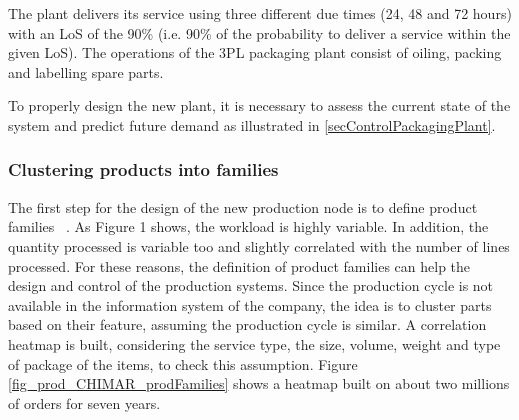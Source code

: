The plant delivers its service using three different due times (24, 48 and 72 hours) with an LoS of the 90\% (i.e. 90\% of the probability to deliver a service within the given LoS). The operations of the 3PL packaging plant consist of oiling, packing and labelling spare parts. \par

To properly design the new plant, it is necessary to assess the current state of the system and predict future demand as illustrated in \ref{secControlPackagingPlant}.

\subsubsection{Clustering products into families}

The first step for the design of the new production node is to define product families ~\cite{Tufano2020ISM}. As Figure 1 shows, the workload is highly variable. In addition, the quantity processed is variable too and slightly correlated with the number of lines processed. For these reasons, the definition of product families can help the design and control of the production systems. Since the production cycle is not available in the information system of the company, the idea is to cluster parts based on their feature, assuming the production cycle is similar. A correlation heatmap is built, considering the service type, the size, volume, weight and type of package of the items, to check this assumption. Figure \ref{fig_prod_CHIMAR_prodFamilies} shows a heatmap built on about two millions of orders for seven years.

